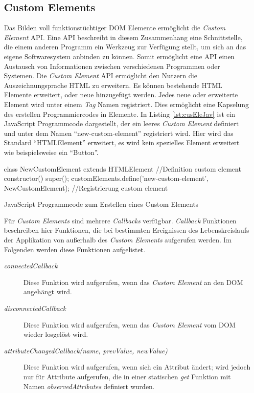 \documentclass[12pt, paper=a4, bibtotoc, toc=listof, headsepline=true]{scrreprt}
\begin{document}
		\subsection{Custom Elements}
		Das Bilden voll funktionstüchtiger \ac{DOM} Elemente ermöglicht die \emph{Custom Element} \ac{API}\cite{Denicola2016}. Eine \ac{API} beschreibt in diesem Zusammenhang eine Schnittstelle, die einem anderen Programm ein Werkzeug zur Verfügung stellt, um sich an das eigene Softwaresystem anbinden zu können\cite{Behrendt2016}. Somit ermöglicht eine \ac{API} einen Austausch von Informationen zwischen verschiedenen Programmen oder Systemen.	
		Die \emph{Custom Element} \ac{API} ermöglicht den Nutzern die Auszeichnungsprache \ac{HTML} zu erweitern\cite{Argelius2016}. Es können bestehende \ac{HTML} Elemente erweitert, oder neue hinzugefügt werden. Jedes neue oder erweiterte Element wird unter einem \emph{Tag} Namen registriert. Dies ermöglicht eine Kapselung des erstellen Programmiercodes in Elemente. In Listing \ref{lst:cusEleJav} ist ein JavaScript Programmcode dargestellt, der ein leeres \emph{Custom Element} definiert und unter dem Namen \enquote{new-custom-element} registriert wird. Hier wird das Standard \enquote{HTMLElement} erweitert, es wird kein spezielles Element erweitert wie beispielsweise ein \enquote{Button}.
		\begin{listing}
			\begin{JavaScriptcode*}{}
class NewCustomElement extends HTMLElement { //Definition custom element
	constructor() {
		super();
	}
}
customElements.define('new-custom-element', NewCustomElement); //Registrierung custom element
			\end{JavaScriptcode*}
			\caption[Erstellung Custom Element]{JavaScript Programmcode zum Erstellen eines Custom Elements}
			\label{lst:cusEleJav}
		\end{listing}
		Für \emph{Custom Elements} sind mehrere \emph{Callbacks} verfügbar. \emph{Callback} Funktionen beschreiben hier Funktionen, die bei bestimmten Ereignissen des Lebenskreislaufs der Applikation von außerhalb des \emph{Custom Elements} aufgerufen werden. Im Folgenden werden diese Funktionen aufgelistet\cite{Argelius2016}.
		\begin{description}  
			\item  [\emph{connectedCallback}] Diese Funktion wird aufgerufen, wenn das \emph{Custom Element} an den \ac{DOM} angehängt wird.			
			\item [\emph{disconnectedCallback}] Diese Funktion wird aufgerufen, wenn das \emph{Custom Element} vom \ac{DOM} wieder losgelöst wird. 			
			\item  [\emph{attributeChangedCallback(name, prevValue, newValue)}] Diese Funktion wird aufgerufen, wenn sich ein Attribut ändert; wird jedoch nur für Attribute aufgerufen, die in einer statischen \emph{get} Funktion mit Namen \emph{observedAttributes} definiert wurden.
		\end{description}
\end{document}
